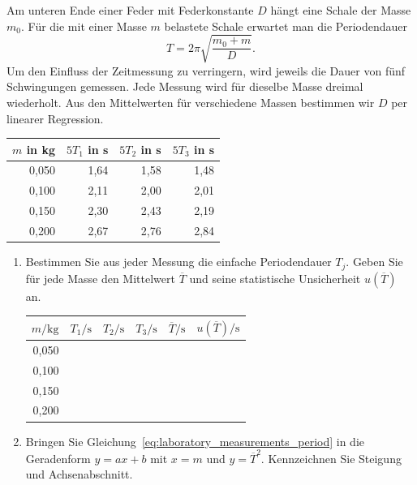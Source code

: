 \begin{ExerciseBlock}
Am unteren Ende einer Feder mit Federkonstante $D$ hängt eine Schale der Masse $m_0$. Für die mit einer Masse $m$ belastete Schale erwartet man die Periodendauer
\begin{equation}\label{eq:laboratory_measurements_period}
 T=2\pi\sqrt{\frac{m_0+m}{D}}.
\end{equation}
Um den Einfluss der Zeitmessung zu verringern, wird jeweils die Dauer von fünf Schwingungen gemessen. Jede Messung wird für dieselbe Masse dreimal wiederholt. Aus den Mittelwerten für verschiedene Massen bestimmen wir $D$ per linearer Regression.
\begin{center}
\begin{tabular}{rrrr}
\toprule
$m$ in \unit{\kilogram} & $5T_1$ in \unit{\second} & $5T_2$ in \unit{\second} & $5T_3$ in \unit{\second}\\
\midrule
0,050 & 1,64 & 1,58 & 1,48\\
0,100 & 2,11 & 2,00 & 2,01\\
0,150 & 2,30 & 2,43 & 2,19\\
0,200 & 2,67 & 2,76 & 2,84\\
\bottomrule
\end{tabular}
\end{center}
\begin{enumerate}
\item Bestimmen Sie aus jeder Messung die einfache Periodendauer $T_j$. Geben Sie für jede Masse den Mittelwert $\overline T$ und seine statistische Unsicherheit $u(\overline T)$ an.
\begin{center}
\renewcommand{\arraystretch}{1.5}
\begin{tabular}{r|p{12mm}|p{12mm}|p{12mm}|p{12mm}|p{19mm}}
\toprule
$m/\unit{\kilogram}$ & $T_1/\unit{\second}$ & $T_2/\unit{\second}$ & $T_3/\unit{\second}$ & $\overline T/\unit{\second}$ & $u(\overline T)/\unit{\second}$\\
\midrule
0,050 & & & & & \\\hline
0,100 & & & & & \\\hline
0,150 & & & & & \\\hline
0,200 & & & & & \\
\bottomrule
\end{tabular}
\end{center}
\item Bringen Sie Gleichung~\eqref{eq:laboratory_measurements_period} in die Geradenform $y=ax+b$ mit $x=m$ und $y=\overline T^2$. Kennzeichnen Sie Steigung und Achsenabschnitt.

\end{enumerate}
\end{ExerciseBlock}
